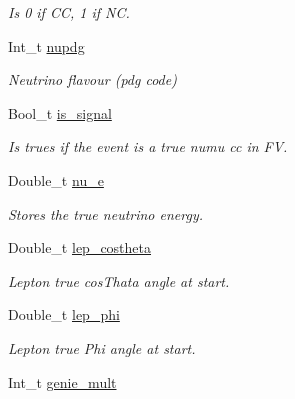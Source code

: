 \begin{DoxyCompactItemize}
\begin{DoxyCompactList}\small\item\em Is 0 if C\-C, 1 if N\-C. \end{DoxyCompactList}\item 
\hypertarget{classUBXSecEvent_a61f5c298a7cebb0c5286b4ed4c7a0627}{Int\-\_\-t \hyperlink{classUBXSecEvent_a61f5c298a7cebb0c5286b4ed4c7a0627}{nupdg}}\label{classUBXSecEvent_a61f5c298a7cebb0c5286b4ed4c7a0627}

\begin{DoxyCompactList}\small\item\em Neutrino flavour (pdg code) \end{DoxyCompactList}\item 
\hypertarget{classUBXSecEvent_a2cc7d9f302e0d413ece8af96b35fcff0}{Bool\-\_\-t \hyperlink{classUBXSecEvent_a2cc7d9f302e0d413ece8af96b35fcff0}{is\-\_\-signal}}\label{classUBXSecEvent_a2cc7d9f302e0d413ece8af96b35fcff0}

\begin{DoxyCompactList}\small\item\em Is trues if the event is a true numu cc in F\-V. \end{DoxyCompactList}\item 
\hypertarget{classUBXSecEvent_a715a5f6d8143a633109ed48fb87e0bbd}{Double\-\_\-t \hyperlink{classUBXSecEvent_a715a5f6d8143a633109ed48fb87e0bbd}{nu\-\_\-e}}\label{classUBXSecEvent_a715a5f6d8143a633109ed48fb87e0bbd}

\begin{DoxyCompactList}\small\item\em Stores the true neutrino energy. \end{DoxyCompactList}\item 
\hypertarget{classUBXSecEvent_a57ac9edd2e200ea54da22ee278079857}{Double\-\_\-t \hyperlink{classUBXSecEvent_a57ac9edd2e200ea54da22ee278079857}{lep\-\_\-costheta}}\label{classUBXSecEvent_a57ac9edd2e200ea54da22ee278079857}

\begin{DoxyCompactList}\small\item\em Lepton true cos\-Thata angle at start. \end{DoxyCompactList}\item 
\hypertarget{classUBXSecEvent_a7b4229f9ab6a20424bffd9ef5a57edc6}{Double\-\_\-t \hyperlink{classUBXSecEvent_a7b4229f9ab6a20424bffd9ef5a57edc6}{lep\-\_\-phi}}\label{classUBXSecEvent_a7b4229f9ab6a20424bffd9ef5a57edc6}

\begin{DoxyCompactList}\small\item\em Lepton true Phi angle at start. \end{DoxyCompactList}\item 
\hypertarget{classUBXSecEvent_a767300e775e92348238668ef99dfdbc8}{Int\-\_\-t \hyperlink{classUBXSecEvent_a767300e775e92348238668ef99dfdbc8}{genie\-\_\-mult}}\label{classUBXSecEvent_a767300e775e92348238668ef99dfdbc8}


\end{DoxyCompactItemize}
